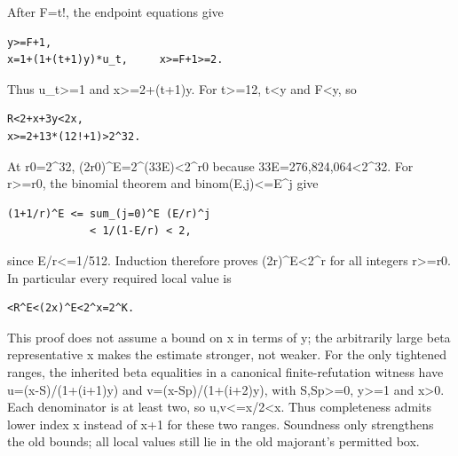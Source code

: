 After F=\allowbreak{}t!, the endpoint equations give



\begin{verbatim}
y>=F+1,
x=1+(1+(t+1)y)*u_t,     x>=F+1>=2.
\end{verbatim}

Thus u\_\allowbreak{}t\textgreater{}\allowbreak{}=\allowbreak{}1 and x\textgreater{}\allowbreak{}=\allowbreak{}2+\allowbreak{}(t+\allowbreak{}1)y. For t\textgreater{}\allowbreak{}=\allowbreak{}12, t\textless{}\allowbreak{}y and F\textless{}\allowbreak{}y, so



\begin{verbatim}
R<2+x+3y<2x,
x>=2+13*(12!+1)>2^32.
\end{verbatim}

At r0=\allowbreak{}2\textasciicircum{}\allowbreak{}32, (2r0)\textasciicircum{}\allowbreak{}E=\allowbreak{}2\textasciicircum{}\allowbreak{}(33E)\textless{}\allowbreak{}2\textasciicircum{}\allowbreak{}r0 because 33E=\allowbreak{}276,824,064\textless{}\allowbreak{}2\textasciicircum{}\allowbreak{}32. For r\textgreater{}\allowbreak{}=\allowbreak{}r0, the binomial theorem and binom(E,j)\textless{}\allowbreak{}=\allowbreak{}E\textasciicircum{}\allowbreak{}j give



\begin{verbatim}
(1+1/r)^E <= sum_(j=0)^E (E/r)^j
             < 1/(1-E/r) < 2,
\end{verbatim}

since E/\allowbreak{}r\textless{}\allowbreak{}=\allowbreak{}1/\allowbreak{}512. Induction therefore proves (2r)\textasciicircum{}\allowbreak{}E\textless{}\allowbreak{}2\textasciicircum{}\allowbreak{}r for all integers r\textgreater{}\allowbreak{}=\allowbreak{}r0. In particular every required local value is



\begin{verbatim}
<R^E<(2x)^E<2^x=2^K.
\end{verbatim}

This proof does not assume a bound on x in terms of y; the arbitrarily large beta representative x makes the estimate stronger, not weaker. For the only tightened ranges, the inherited beta equalities in a canonical finite-refutation witness have u=\allowbreak{}(x-S)/\allowbreak{}(1+\allowbreak{}(i+\allowbreak{}1)y) and v=\allowbreak{}(x-Sp)/\allowbreak{}(1+\allowbreak{}(i+\allowbreak{}2)y), with S,Sp\textgreater{}\allowbreak{}=\allowbreak{}0, y\textgreater{}\allowbreak{}=\allowbreak{}1 and x\textgreater{}\allowbreak{}0. Each denominator is at least two, so u,v\textless{}\allowbreak{}=\allowbreak{}x/\allowbreak{}2\textless{}\allowbreak{}x. Thus completeness admits lower index x instead of x+\allowbreak{}1 for these two ranges. Soundness only strengthens the old bounds; all local values still lie in the old majorant's permitted box.



